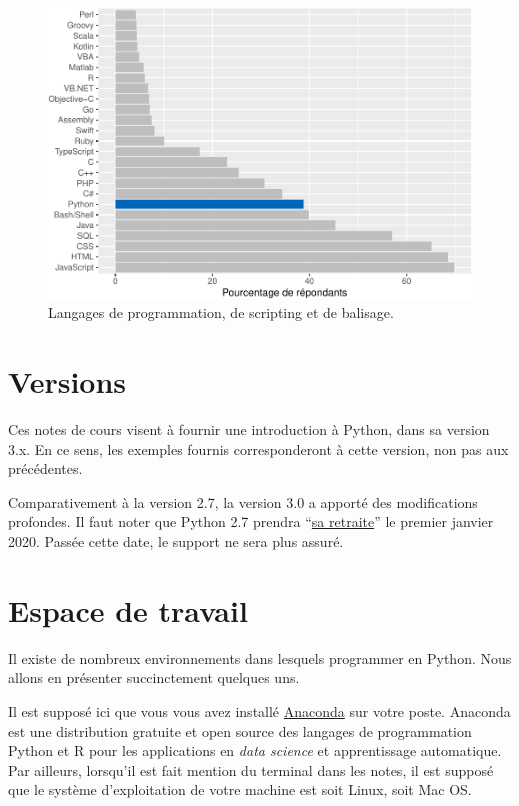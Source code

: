 \documentclass[
  12pt,
]{book}
\numberwithin{equation}{section}
\numberwithin{countremarque}{section}
\begin{document}
\begin{figure}

{\centering \includegraphics{_main_files/figure-latex/intro-stack-langages-1} 

}

\caption{Langages de programmation, de scripting et de balisage.}\label{fig:intro-stack-langages}
\end{figure}

\section{Versions}\label{versions}

Ces notes de cours visent à fournir une introduction à Python, dans sa version 3.x. En ce sens, les exemples fournis corresponderont à cette version, non pas aux précédentes.

Comparativement à la version 2.7, la version 3.0 a apporté des modifications profondes. Il faut noter que Python 2.7 prendra ``\href{https://pythonclock.org/}{sa retraite}'' le premier janvier 2020. Passée cette date, le support ne sera plus assuré.

\section{Espace de travail}\label{espace-de-travail}

Il existe de nombreux environnements dans lesquels programmer en Python. Nous allons en présenter succinctement quelques uns.

Il est supposé ici que vous vous avez installé \href{https://www.anaconda.com/}{Anaconda} sur votre poste. Anaconda est une distribution gratuite et open source des langages de programmation Python et R pour les applications en \emph{data science} et apprentissage automatique. Par ailleurs, lorsqu'il est fait mention du terminal dans les notes, il est supposé que le système d'exploitation de votre machine est soit Linux, soit Mac OS.
\end{document}

